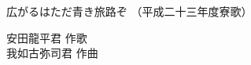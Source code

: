 \documentclass[10pt,b5j]{tarticle} %
\begin{document}
\begin{minipage}[c]{0.7\hsize} %
    \begin{center}
        {\LARGE
            広がるはただ青き旅路ぞ %
        }
        {\small 
            （平成二十三年度寮歌） %
        }
    \end{center}
\end{minipage}
\begin{minipage}[c]{0.3\hsize} %
    \begin{flushright} %
        安田龍平君 作歌\\我如古弥司君 作曲 %
    \end{flushright}
\end{minipage}
\end{document}
